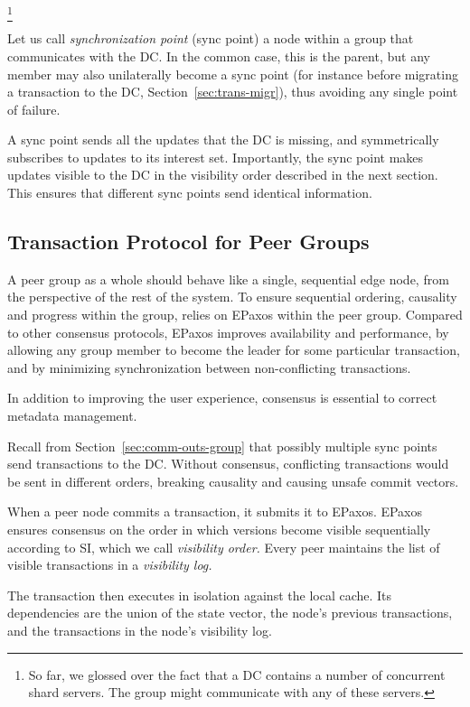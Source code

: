\footnote{

So far, we glossed over the fact that a DC contains a number of
concurrent shard servers. The group might communicate with any of
these servers. }

Let us call \emph{synchronization point} (sync point) a node within a
group that communicates with the DC\@.
In the common case, this is the parent, but any member may also
unilaterally become a sync point (for instance before migrating a
transaction to the DC, Section~\ref{sec:trans-migr}), thus avoiding any
single point of failure.

A sync point sends all the updates that the DC is missing, and
symmetrically subscribes to updates to its interest set.
Importantly, the sync point makes updates visible to the DC in the
visibility order described in the next section.
This ensures that different sync points send identical information.

\subsection{Transaction Protocol for Peer Groups}
\label{sec:group-txn}

A peer group as a whole should behave like a single, sequential edge
node, from the perspective of the rest of the system.
To ensure sequential ordering, causality and progress within the group,
\system{} relies on EPaxos \cite{syn:rep:1843} within the peer group.
Compared to other consensus protocols, EPaxos improves availability and
performance, by allowing any group member to become the leader for some
particular transaction, and by minimizing synchronization between
non-conflicting transactions.

In addition to improving the user experience, consensus is essential to
correct metadata management.

Recall from Section~\ref{sec:comm-outs-group} that possibly multiple
sync points send transactions to the DC\@.
Without consensus, conflicting transactions would be sent in different orders,
breaking causality and causing unsafe commit vectors.

When a peer node commits a transaction, it submits it to EPaxos.
EPaxos ensures consensus on the order in which versions become visible
sequentially 
according to SI, which we call \emph{visibility order.}
Every peer maintains the list of visible transactions in a
\emph{visibility log.}

The transaction then executes in isolation against the local cache.
Its dependencies are the union of the state vector, the node's previous
transactions, and the transactions in the node's visibility log.

